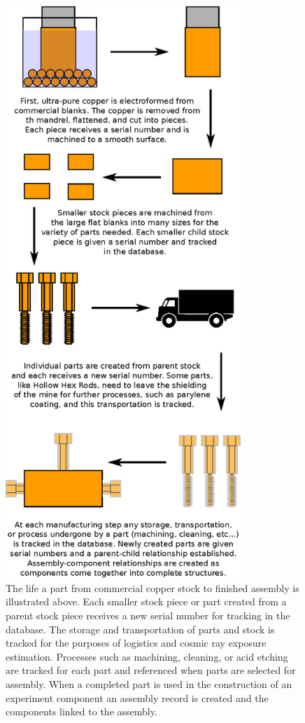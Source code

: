 \documentclass[journal]{IEEEtran}
\begin{document}
\begin{figure}[!t]
\centering
\includegraphics[width=3.5in]{example_part}
\caption{The life a part from commercial copper stock to finished assembly is illustrated above. Each smaller stock piece or part created from a
parent stock piece receives a new serial number for tracking in the database. The storage and transportation of parts and stock is tracked for the
purposes of logistics and cosmic ray exposure estimation. Processes such as machining, cleaning, or acid etching are tracked for each part and
referenced when parts are selected for assembly. When
a completed part is used in the construction of an experiment component an assembly record is created and the components linked to the assembly.}
\label{example_part}
\end{figure}
\end{document}
